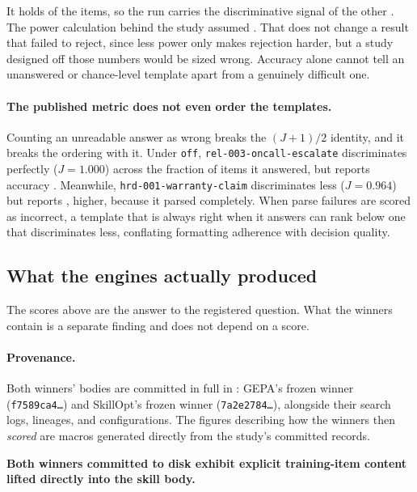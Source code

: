 It holds \NUM{\lowSignalItems} of the \NUM{\totalItems} items, so the run
carries the discriminative signal of the other \NUM{\signalItems}. The power
calculation behind the study assumed \NUM{\totalItems}. That does not change
a result that failed to reject, since less power only makes rejection harder,
but a study designed off those numbers would be sized wrong. Accuracy alone
cannot tell an unanswered or chance-level template apart from a genuinely difficult one.

\paragraph{The published metric does not even order the templates.} Counting
an unreadable answer as wrong breaks the $(J+1)/2$ identity, and it breaks
the ordering with it. Under \texttt{off}, \texttt{rel-003-oncall-escalate} discriminates
perfectly ($J = 1.000$) across the \NUM{\parseRateSeenRelZeroZeroThreeOncallEscalateOff} fraction
of items it answered, but reports accuracy \NUM{\accSeenRelZeroZeroThreeOncallEscalateOff}. Meanwhile,
\texttt{hrd-001-warranty-claim} discriminates less ($J = 0.964$) but reports
\NUM{\accSeenHrdZeroZeroOneWarrantyClaimOff}, higher, because it parsed completely.
When parse failures are scored as incorrect, a template that is always right when it answers
can rank below one that discriminates less, conflating formatting adherence with decision quality.

\subsection{What the engines actually produced}
\label{sec:whatengines}

The scores above are the answer to the registered question. What the winners
contain is a separate finding and does not depend on a score.

\paragraph{Provenance.} Both winners' bodies are committed in full in
: GEPA's frozen winner (\texttt{f7589ca4\ldots}) and
SkillOpt's frozen winner (\texttt{7a2e2784\ldots}), alongside their search logs,
lineages, and configurations. The figures describing how the winners then
\emph{scored} are macros generated directly from the study's committed records.

\textbf{Both winners committed to disk exhibit explicit training-item content
lifted directly into the skill body.}

